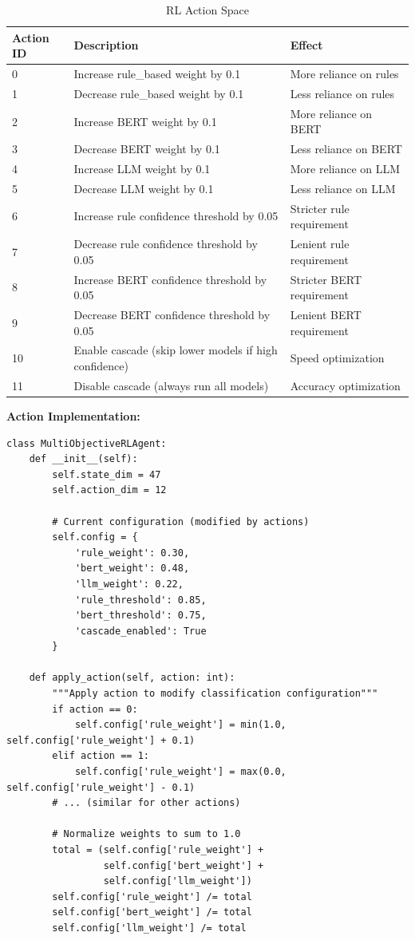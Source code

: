 \begin{table}[h]
\centering
\caption{RL Action Space}
\begin{tabularx}{\textwidth}{lXl}
\toprule
\textbf{Action ID} & \textbf{Description} & \textbf{Effect} \\
\midrule
0 & Increase rule\_based weight by 0.1 & More reliance on rules \\
1 & Decrease rule\_based weight by 0.1 & Less reliance on rules \\
2 & Increase BERT weight by 0.1 & More reliance on BERT \\
3 & Decrease BERT weight by 0.1 & Less reliance on BERT \\
4 & Increase LLM weight by 0.1 & More reliance on LLM \\
5 & Decrease LLM weight by 0.1 & Less reliance on LLM \\
6 & Increase rule confidence threshold by 0.05 & Stricter rule requirement \\
7 & Decrease rule confidence threshold by 0.05 & Lenient rule requirement \\
8 & Increase BERT confidence threshold by 0.05 & Stricter BERT requirement \\
9 & Decrease BERT confidence threshold by 0.05 & Lenient BERT requirement \\
10 & Enable cascade (skip lower models if high confidence) & Speed optimization \\
11 & Disable cascade (always run all models) & Accuracy optimization \\
\bottomrule
\end{tabularx}
\end{table}

\textbf{Action Implementation:}
\begin{lstlisting}[style=pythonstyle]
class MultiObjectiveRLAgent:
    def __init__(self):
        self.state_dim = 47
        self.action_dim = 12
        
        # Current configuration (modified by actions)
        self.config = {
            'rule_weight': 0.30,
            'bert_weight': 0.48,
            'llm_weight': 0.22,
            'rule_threshold': 0.85,
            'bert_threshold': 0.75,
            'cascade_enabled': True
        }
    
    def apply_action(self, action: int):
        """Apply action to modify classification configuration"""
        if action == 0:
            self.config['rule_weight'] = min(1.0, self.config['rule_weight'] + 0.1)
        elif action == 1:
            self.config['rule_weight'] = max(0.0, self.config['rule_weight'] - 0.1)
        # ... (similar for other actions)
        
        # Normalize weights to sum to 1.0
        total = (self.config['rule_weight'] + 
                 self.config['bert_weight'] + 
                 self.config['llm_weight'])
        self.config['rule_weight'] /= total
        self.config['bert_weight'] /= total
        self.config['llm_weight'] /= total
\end{lstlisting}


